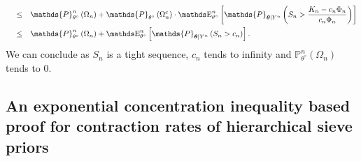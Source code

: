 \begin{pro}
\begin{alignat*}{3}
& && \leq && \mathds{P}_{\theta^{\circ}}^{n}\left(\Omega_{n}\right) + \mathds{P}_{\theta^{\circ}}\left(\Omega_{n}^{c}\right) \cdot \E_{\theta^{\circ}}^{n}\left[\mathds{P}_{\boldsymbol{\theta} \vert Y^{n}}\left(S_{n} > \frac{K_{n} - c_{n} \Phi_{n}}{c_{n} \Phi_{n}} \right)\right]\\
& && \leq && \mathds{P}_{\theta^{\circ}}^{n}\left(\Omega_{n}\right) + \E_{\theta^{\circ}}^{n}\left[\mathds{P}_{\boldsymbol{\theta} \vert Y^{n}}\left(S_{n} > c_{n} \right)\right].
\end{alignat*}
We can conclude as $S_{n}$ is a tight sequence, $c_{n}$ tends to infinity and $\mathds{P}_{\theta^{\circ}}^{n}\left(\Omega_{n}\right)$ tends to $0$.
\end{pro}

\subsection{An exponential concentration inequality based proof for contraction rates of hierarchical sieve priors}\label{2.3.2}

